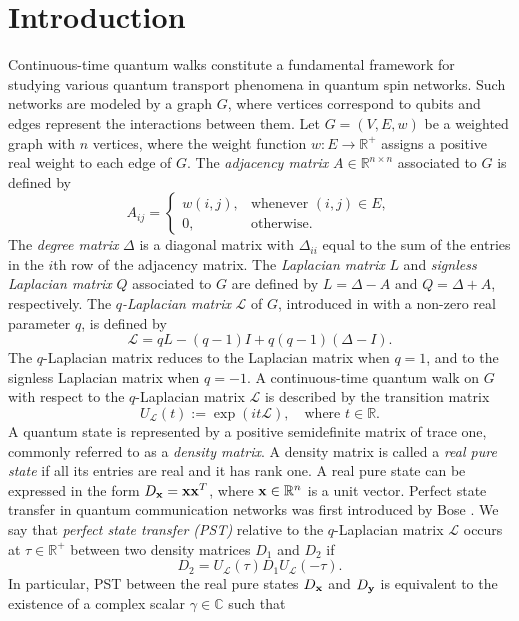 \documentclass[12pt,a4paper]{article}
\def \x {{\bf x}}
\def \y {{\bf y}}
\newcommand{\ob}[1]{\left(#1\right)}
\begin{document}
\section{Introduction}
Continuous-time quantum walks \cite{farhi} constitute a fundamental framework for studying various quantum transport phenomena in quantum spin networks. Such networks are modeled by a graph $G$, where vertices correspond to qubits and edges represent the interactions between them. Let $G = (V, E, w)$ be a weighted graph with $n$ vertices, where the weight function $w: E \rightarrow \mathbb{R}^+$ assigns a positive real weight to each edge of $G$. The \emph{adjacency matrix} $A \in \mathbb{R}^{n \times n}$ associated to $G$ is defined by
\[
A_{ij} = 
\begin{cases} 
w(i,j), & \text{whenever } (i,j) \in E, \\
0, & \text{otherwise}.
\end{cases}
\]
The \emph{degree matrix} $\Delta$ is a diagonal matrix with $\Delta_{ii}$ equal to the sum of the entries in the $i$th row of the adjacency matrix. The \emph{Laplacian matrix} $L$ and \emph{signless Laplacian matrix} $Q$ associated to $G$ are defined by $L = \Delta - A$ and $Q = \Delta + A$, respectively. The \emph{$q$-Laplacian matrix} $\mathscr{L}$ of $G$, introduced in \cite{bapat} with a non-zero real parameter $q$, is defined by
\begin{equation}\label{E1}
 \mathscr{L} = q L - (q - 1) I + q (q - 1) (\Delta - I).
\end{equation}
The $q$-Laplacian matrix reduces to the Laplacian matrix when $q = 1$, and to the signless Laplacian matrix when $q = -1$. A continuous-time quantum walk on $G$ with respect to the $q$-Laplacian matrix $\mathscr{L}$ is described by the transition matrix
\[
U_{\mathscr{L}}(t) := \exp{\ob{i t \mathscr{L}}}, \quad \text{where } t \in \mathbb{R}.
\]
A quantum state is represented by a positive semidefinite matrix of trace one, commonly referred to as a \emph{density matrix}. A density matrix is called a \emph{real pure state} if all its entries are real and it has rank one. A real pure state can be expressed in the form $D_\x = \x \x^T$, where $\x \in \mathbb{R}^n$ is a unit vector. Perfect state transfer in quantum communication networks was first introduced by Bose \cite{bose}. We say that \emph{perfect state transfer (PST)} relative to the $q$-Laplacian matrix $\mathscr{L}$ occurs at $\tau \in \mathbb{R}^+$ between two density matrices $D_1$ and $D_2$ if
\[
D_2 = U_\mathscr{L}(\tau) D_1 U_\mathscr{L}(-\tau).
\]
In particular, PST between the real pure states $D_{\x}$ and $D_{\y}$ is equivalent to the existence of a complex scalar $\gamma \in \mathbb{C}$ such that
\end{document}
